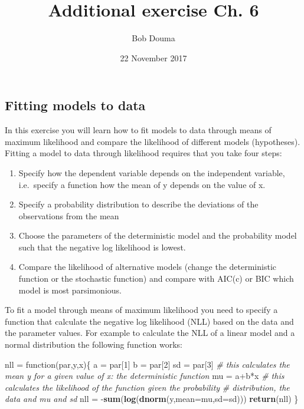 \documentclass[]{article}
\title{Additional exercise Ch. 6}
\author{Bob Douma}
\date{22 November 2017}
\newenvironment{Shaded}{\begin{snugshade}}{\end{snugshade}}
\newcommand{\KeywordTok}[1]{\textcolor[rgb]{0.13,0.29,0.53}{\textbf{{#1}}}}
\newcommand{\DataTypeTok}[1]{\textcolor[rgb]{0.13,0.29,0.53}{{#1}}}
\newcommand{\DecValTok}[1]{\textcolor[rgb]{0.00,0.00,0.81}{{#1}}}
\newcommand{\StringTok}[1]{\textcolor[rgb]{0.31,0.60,0.02}{{#1}}}
\newcommand{\CommentTok}[1]{\textcolor[rgb]{0.56,0.35,0.01}{\textit{{#1}}}}
\newcommand{\NormalTok}[1]{{#1}}
\providecommand{\tightlist}{%
  \setlength{\itemsep}{0pt}\setlength{\parskip}{0pt}}
\begin{document}
\maketitle

\subsection{Fitting models to data}\label{fitting-models-to-data}

In this exercise you will learn how to fit models to data through means
of maximum likelihood and compare the likelihood of different models
(hypotheses). Fitting a model to data through likelihood requires that
you take four steps:

\begin{enumerate}
\def\labelenumi{\arabic{enumi}.}
\tightlist
\item
  Specify how the dependent variable depends on the independent
  variable, i.e.~specify a function how the mean of y depends on the
  value of x.
\item
  Specify a probability distribution to describe the deviations of the
  observations from the mean
\item
  Choose the parameters of the deterministic model and the probability
  model such that the negative log likelihood is lowest.
\item
  Compare the likelihood of alternative models (change the deterministic
  function or the stochastic function) and compare with AIC(c) or BIC
  which model is most parsimonious.
\end{enumerate}

To fit a model through means of maximum likelihood you need to specify a
function that calculate the negative log likelihood (NLL) based on the
data and the parameter values. For example to calculate the NLL of a
linear model and a normal distribution the following function works:

\begin{Shaded}
\begin{Highlighting}[]
\NormalTok{nll =}\StringTok{ }\NormalTok{function(par,y,x)\{}
  \NormalTok{a =}\StringTok{ }\NormalTok{par[}\DecValTok{1}\NormalTok{]}
  \NormalTok{b =}\StringTok{ }\NormalTok{par[}\DecValTok{2}\NormalTok{]}
  \NormalTok{sd =}\StringTok{ }\NormalTok{par[}\DecValTok{3}\NormalTok{]}
  \CommentTok{# this calculates the mean y for a given value of x: the deterministic function}
  \NormalTok{mu =}\StringTok{ }\NormalTok{a+b*x }
  \CommentTok{# this calculates the likelihood of the function given the probability }
  \CommentTok{# distribution, the data and mu and sd}
  \NormalTok{nll =}\StringTok{ }\NormalTok{-}\KeywordTok{sum}\NormalTok{(}\KeywordTok{log}\NormalTok{(}\KeywordTok{dnorm}\NormalTok{(y,}\DataTypeTok{mean=}\NormalTok{mu,}\DataTypeTok{sd=}\NormalTok{sd))) }
  \KeywordTok{return}\NormalTok{(nll)}
\NormalTok{\}}
\end{Highlighting}
\end{Shaded}
\end{document}
